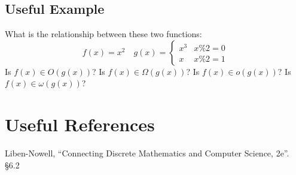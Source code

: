 \subsection{Useful Example}
What is the relationship between these two functions: 
\[f(x) = x^2 \quad g(x) = \begin{cases}x^3 & x\%2=0\\x & x\%2=1\end{cases}\]
Is $f(x)\in O(g(x))$? Is $f(x)\in \Omega(g(x))$? Is $f(x)\in o(g(x))$? Is $f(x)\in \omega(g(x))$?

\section*{Useful References}

Liben-Nowell, ``Connecting Discrete Mathematics and Computer Science, 2e''. \S 6.2

  